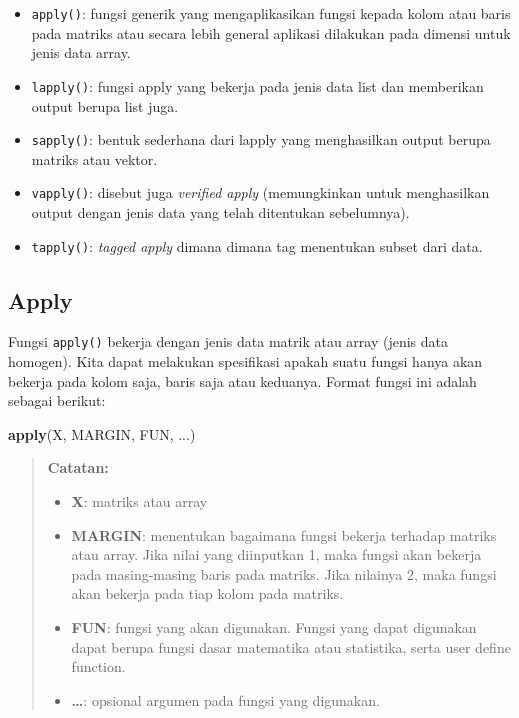 \documentclass[]{book}
\newenvironment{Shaded}{\begin{snugshade}}{\end{snugshade}}
\newcommand{\KeywordTok}[1]{\textcolor[rgb]{0.13,0.29,0.53}{\textbf{#1}}}
\newcommand{\NormalTok}[1]{#1}
\providecommand{\tightlist}{%
  \setlength{\itemsep}{0pt}\setlength{\parskip}{0pt}}
\theoremstyle{definition}
\theoremstyle{definition}
\theoremstyle{definition}
\theoremstyle{remark}
\begin{document}
\begin{itemize}
\tightlist
\item
  \texttt{apply()}: fungsi generik yang mengaplikasikan fungsi kepada kolom atau baris pada matriks atau secara lebih general aplikasi dilakukan pada dimensi untuk jenis data array.
\item
  \texttt{lapply()}: fungsi apply yang bekerja pada jenis data list dan memberikan output berupa list juga.
\item
  \texttt{sapply()}: bentuk sederhana dari lapply yang menghasilkan output berupa matriks atau vektor.
\item
  \texttt{vapply()}: disebut juga \emph{verified apply} (memungkinkan untuk menghasilkan output dengan jenis data yang telah ditentukan sebelumnya).
\item
  \texttt{tapply()}: \emph{tagged apply} dimana dimana tag menentukan subset dari data.
\end{itemize}

\hypertarget{apply}{%
\subsection{Apply}\label{apply}}

Fungsi \texttt{apply()} bekerja dengan jenis data matrik atau array (jenis data homogen). Kita dapat melakukan spesifikasi apakah suatu fungsi hanya akan bekerja pada kolom saja, baris saja atau keduanya. Format fungsi ini adalah sebagai berikut:

\begin{Shaded}
\begin{Highlighting}[]
\KeywordTok{apply}\NormalTok{(X, MARGIN, FUN, ...)}
\end{Highlighting}
\end{Shaded}

\begin{quote}
\textbf{Catatan:}

\begin{itemize}
\tightlist
\item
  \textbf{X}: matriks atau array
\item
  \textbf{MARGIN}: menentukan bagaimana fungsi bekerja terhadap matriks atau array. Jika nilai yang diinputkan 1, maka fungsi akan bekerja pada masing-masing baris pada matriks. Jika nilainya 2, maka fungsi akan bekerja pada tiap kolom pada matriks.
\item
  \textbf{FUN}: fungsi yang akan digunakan. Fungsi yang dapat digunakan dapat berupa fungsi dasar matematika atau statistika, serta user define function.
\item
  \textbf{\ldots{}}: opsional argumen pada fungsi yang digunakan.
\end{itemize}
\end{quote}
\end{document}
